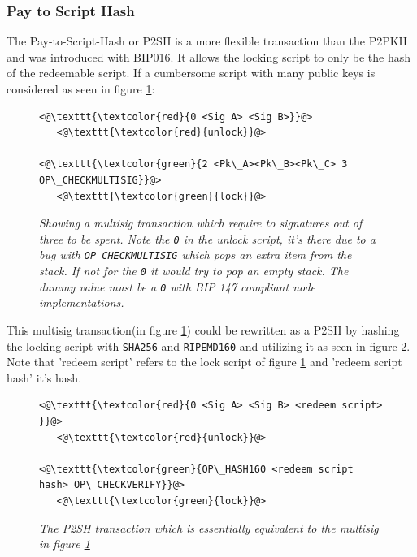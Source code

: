 \subsubsection{Pay to Script Hash}

The Pay-to-Script-Hash or P2SH is a more flexible transaction than the P2PKH and was introduced with BIP016\cite{bip:0016:p2sh}. It allows the locking script to only be the hash of the redeemable script. If a cumbersome script with many public keys is considered as seen in figure \ref{fig:cumbersome:script}:

\begin{figure}
	
	\begin{lstlisting}
<@\texttt{\textcolor{red}{0 <Sig A> <Sig B>}}@>   
   <@\texttt{\textcolor{red}{unlock}}@>
	
<@\texttt{\textcolor{green}{2 <Pk\_A><Pk\_B><Pk\_C> 3 OP\_CHECKMULTISIG}}@>
   <@\texttt{\textcolor{green}{lock}}@>
	\end{lstlisting}
	
	\caption{\textit{ Showing a multisig transaction which require to signatures out of three to be spent. Note the \texttt{0} in the unlock script, it's there due to a bug with \texttt{OP\_CHECKMULTISIG} which pops an extra item from the stack. If not for the \texttt{0} it would try to pop an empty stack. The dummy value must be a \texttt{0} with BIP 147 compliant node implementations\cite{bip:0147:dummy:zero}.
	}}
	\label{fig:cumbersome:script}
\end{figure} 

This multisig transaction(in figure \ref{fig:cumbersome:script}) could be rewritten as a P2SH by hashing the locking script with \texttt{SHA256} and  \texttt{RIPEMD160} and utilizing it as seen in figure \ref{fig:p2sh}. Note that 'redeem script' refers to the lock script of figure \ref{fig:cumbersome:script} and 'redeem script hash' it's hash.

\begin{figure}[hbt!]
	
	\begin{lstlisting}
<@\texttt{\textcolor{red}{0 <Sig A> <Sig B> <redeem script> }}@>   
   <@\texttt{\textcolor{red}{unlock}}@>
	
<@\texttt{\textcolor{green}{OP\_HASH160 <redeem script hash> OP\_CHECKVERIFY}}@>
   <@\texttt{\textcolor{green}{lock}}@>
	\end{lstlisting}
	
	\caption{\textit{ The P2SH transaction which is essentially equivalent to the multisig in figure \ref{fig:cumbersome:script}
	}}
	\label{fig:p2sh}
\end{figure}

